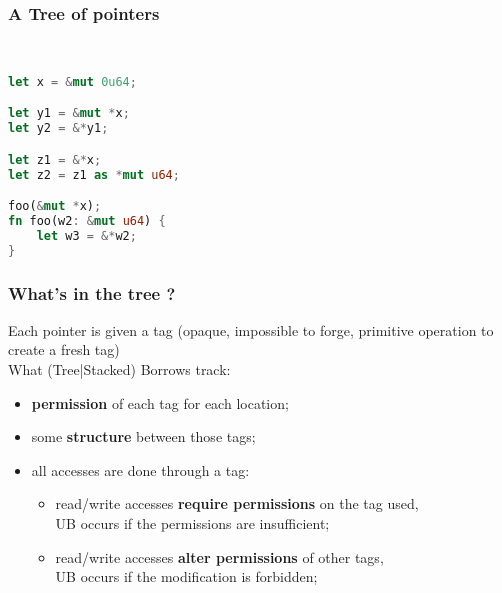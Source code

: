 \begin{frame}[fragile]
    \frametitle{A Tree of pointers}
    \begin{minipage}{0.45\textwidth}
        \begin{block}{}
        \end{block}
    \end{minipage}
    ~\ ~\
    \begin{minipage}{0.45\textwidth}
        \begin{block}{}
            \begin{lstlisting}[language=rust]
let x = &mut 0u64;

let y1 = &mut *x;
let y2 = &*y1;

let z1 = &*x;
let z2 = z1 as *mut u64;

foo(&mut *x);
fn foo(w2: &mut u64) {
    let w3 = &*w2;
}

            \end{lstlisting}
        \end{block}
    \end{minipage}
\end{frame}

\begin{frame}
    \frametitle{What's in the tree ?}
    Each pointer is given a tag (opaque, impossible to forge, primitive operation to create a fresh tag)
    ~\\
    What (Tree|Stacked) Borrows track:
    \begin{itemize}
        \item \textbf{permission} of each tag for each location;
        \item some \textbf{structure} between those tags;
        \item all accesses are done through a tag:
            \begin{itemize}
                \item read/write accesses \textbf{require permissions} on the tag used,\\
                    UB occurs if the permissions are insufficient;
                \item read/write accesses \textbf{alter permissions} of other tags,\\
                    UB occurs if the modification is forbidden;
            \end{itemize}
    \end{itemize}
\end{frame}

